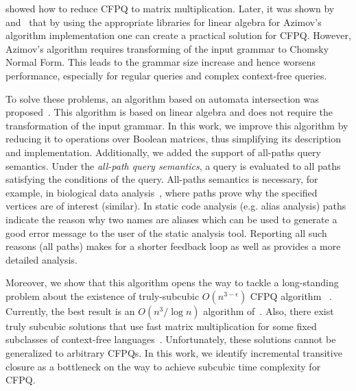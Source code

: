 \cite{Azimov:2018:CPQ:3210259.3210264} showed how to reduce CFPQ to matrix multiplication.
Later, it was shown by~\cite{Mishin:2019:ECP:3327964.3328503} and~\cite{10.1145/3398682.3399163} that by using the appropriate libraries for linear algebra for Azimov's algorithm implementation one can create a practical solution for CFPQ.
However, Azimov's algorithm requires transforming of the input grammar to Chomsky Normal Form.
This leads to the grammar size increase and hence worsens performance, especially for regular queries and complex context-free queries.

To solve these problems, an algorithm based on automata intersection was proposed~\cite{10.1007/978-3-030-54832-2_6}.
This algorithm is based on linear algebra and does not require the transformation of the input grammar.
In this work, we improve this algorithm by reducing it to operations over Boolean matrices, thus simplifying its description and implementation.
Additionally, we added the support of all-paths query semantics.
Under the \textit{all-path query semantics}, a query is evaluated to all paths satisfying the conditions of the query.
All-paths semantics is necessary, for example, in biological data analysis~\cite{GraphQueryWithEarley}, where paths prove why the specified vertices are of interest (similar).
In static code analysis (e.g. alias analysis) paths indicate the reason why two names are aliases which can be used to generate a good error message to the user of the static analysis tool. Reporting all such reasons (all paths) makes for a shorter feedback loop as well as provides a more detailed analysis.

Moreover, we show that this algorithm opens the way to tackle a long-standing problem about the existence of truly-subcubic $O(n^{3-\epsilon})$ CFPQ algorithm ~\cite{10.1145/1328438.1328460, Yannakakis}.
Currently, the best result is an $O(n^3/\log{n})$ algorithm of~\cite{10.1145/1328438.1328460}.
Also, there exist truly subcubic solutions that use fast matrix multiplication for some fixed subclasses of context-free languages~\cite{8249039}.
Unfortunately, these solutions cannot be generalized to arbitrary CFPQs.
In this work, we identify incremental transitive closure as a bottleneck on the way to achieve subcubic time complexity for CFPQ.

